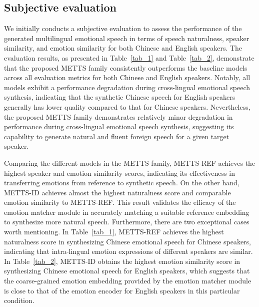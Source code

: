 \documentclass[journal,comsoc]{IEEEtran}
\begin{document}
\subsection{Subjective evaluation}

We initially conducts a subjective evaluation to assess the performance of the generated multilingual emotional speech in terms of speech naturalness, speaker similarity, and emotion similarity for both Chinese and English speakers. The evaluation results, as presented in Table~\ref{tab_1} and Table~\ref{tab_2}, demonstrate that the proposed METTS family consistently outperforms the baseline models across all evaluation metrics for both Chinese and English speakers. Notably, all models exhibit a performance degradation during cross-lingual emotional speech synthesis, indicating that the synthetic Chinese speech for English speakers generally has lower quality compared to that for Chinese speakers. Nevertheless, the proposed METTS family demonstrates relatively minor degradation in performance during cross-lingual emotional speech synthesis, suggesting its capability to generate natural and fluent foreign speech for a given target speaker.

Comparing the different models in the METTS family, METTS-REF achieves the highest speaker and emotion similarity scores, indicating its effectiveness in transferring emotions from reference to synthetic speech. On the other hand, METTS-ID achieves almost the highest naturalness score and comparable emotion similarity to METTS-REF. This result validates the efficacy of the emotion matcher module in accurately matching a suitable reference embedding to synthesize more natural speech. Furthermore, there are two exceptional cases worth mentioning. In Table~\ref{tab_1}, METTS-REF achieves the highest naturalness score in synthesizing Chinese emotional speech for Chinese speakers, indicating that intra-lingual emotion expressions of different speakers are similar. In Table~\ref{tab_2}, METTS-ID obtains the highest emotion similarity score in synthesizing Chinese emotional speech for English speakers, which suggests that the coarse-grained emotion embedding provided by the emotion matcher module is close to that of the emotion encoder for English speakers in this particular condition.
\end{document}
